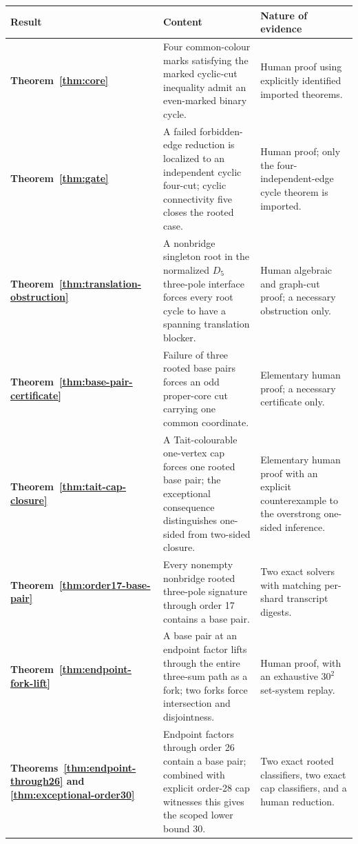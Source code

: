 \documentclass[11pt]{article}
\theoremstyle{definition}
\theoremstyle{remark}
\begin{document}
\begin{center}
\begin{tabularx}{\textwidth}{@{}
  >{\raggedright\arraybackslash\bfseries}p{}
  >{\raggedright\arraybackslash}X
  >{\raggedright\arraybackslash}p{}@{}}
\toprule
Result & Content & Nature of evidence\\
\midrule
Theorem~\ref{thm:core}
  & Four common-colour marks satisfying the marked cyclic-cut
    inequality admit an even-marked binary cycle.
  & Human proof using explicitly identified imported theorems.\\
Theorem~\ref{thm:gate}
  & A failed forbidden-edge reduction is localized to an independent
    cyclic four-cut; cyclic connectivity five closes the rooted case.
  & Human proof; only the four-independent-edge cycle theorem is
    imported.\\
Theorem~\ref{thm:translation-obstruction}
  & A nonbridge singleton root in the normalized \(D_5\) three-pole
    interface forces every root cycle to have a spanning translation
    blocker.
  & Human algebraic and graph-cut proof; a necessary obstruction only.\\
Theorem~\ref{thm:base-pair-certificate}
  & Failure of three rooted base pairs forces an odd proper-core cut
    carrying one common coordinate.
  & Elementary human proof; a necessary certificate only.\\
Theorem~\ref{thm:tait-cap-closure}
  & A Tait-colourable one-vertex cap forces one rooted base pair; the
    exceptional consequence distinguishes one-sided from two-sided
    closure.
  & Elementary human proof with an explicit counterexample to the
    overstrong one-sided inference.\\
Theorem~\ref{thm:order17-base-pair}
  & Every nonempty nonbridge rooted three-pole signature through order
    17 contains a base pair.
  & Two exact solvers with matching per-shard transcript digests.\\
Theorem~\ref{thm:endpoint-fork-lift}
  & A base pair at an endpoint factor lifts through the entire
    three-sum path as a fork; two forks force intersection and
    disjointness.
  & Human proof, with an exhaustive \(30^2\) set-system replay.\\
Theorems~\ref{thm:endpoint-through26} and
\ref{thm:exceptional-order30}
  & Endpoint factors through order 26 contain a base pair; combined
    with explicit order-28 cap witnesses this gives the scoped lower
    bound 30.
  & Two exact rooted classifiers, two exact cap classifiers, and a
    human reduction.\\

\end{tabularx}
\end{center}
\end{document}
